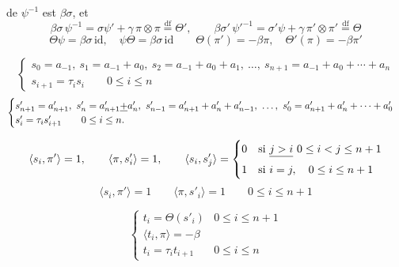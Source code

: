 \documentclass[11pt,a4paper]{article}
\begin{document}
 de $\psi^{-1}$ est $\beta\sigma$, et
\[
\beta\sigma\,\psi^{-1} = \sigma\psi' + \gamma\,\pi \otimes \pi \overset{\text{df}}{=} \Theta',
\qquad
\beta\sigma'\,\psi'^{-1} = \sigma'\psi + \gamma\,\pi' \otimes \pi' \overset{\text{df}}{=} \Theta
\]
\[
\Theta\psi = \beta\sigma\,\mathrm{id}, \quad \psi\Theta = \beta\sigma\,\mathrm{id}
\qquad
\Theta(\pi') = -\beta\pi, \quad \Theta'(\pi) = -\beta\pi'
\]

\[
\begin{cases}
s_0 = a_{-1},\ s_1 = a_{-1} + a_0,\ s_2 = a_{-1} + a_0 + a_1,\ \ldots,\ s_{n+1} = a_{-1} + a_0 + \cdots + a_n \\
s_{i+1} = \tau_i s_i \qquad 0 \leq i \leq n
\end{cases}
\]
\[
\begin{cases}
s'_{n+1} = a'_{n+1},\ s'_n = a'_{n+1} \uncertain{+} a'_n,\ s'_{n-1} = a'_{n+1} + a'_n + a'_{n-1},\ \ldots,\ s'_0 = a'_{n+1} + a'_n + \cdots + a'_0 \\
s'_i = \tau_i s'_{i+1} \qquad 0 \leq i \leq n.
\end{cases}
\]

\[
\langle s_i, \pi' \rangle = 1, \qquad \langle \pi, s'_i \rangle = 1,
\qquad
\langle s_i, s'_j \rangle =
\begin{cases}
0 & \text{si } \struck{j > i}\ 0 \leq i < j \leq n+1 \\
1 & \text{si } i = j, \quad 0 \leq i \leq n+1
\end{cases}
\]
\[
\langle s_i, \pi' \rangle = 1 \qquad \langle \pi, s'_i \rangle = 1 \qquad 0 \leq i \leq n+1
\]

\[
\begin{cases}
t_i = \Theta(s'_i) & 0 \leq i \leq n+1 \\
\langle t_i, \pi \rangle = -\beta \\
t_i = \tau_i t_{i+1} & 0 \leq i \leq n
\end{cases}
\]
\end{document}
